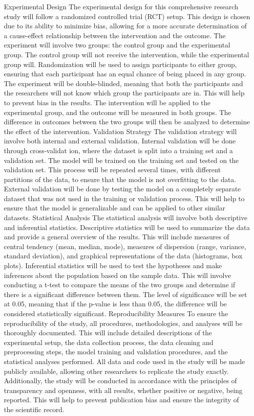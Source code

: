 \documentclass[conference]{IEEEtran}
\begin{document}
Experimental Design The experimental design for this comprehensive research study will follow a randomized controlled trial (RCT) setup. This design is chosen due to its ability to minimize bias, allowing for a more accurate determination of a cause-effect relationship between the intervention and the outcome. The experiment will involve two groups: the control group and the experimental group. The control group will not receive the intervention, while the experimental group will. Randomization will be used to assign participants to either group, ensuring that each participant has an equal chance of being placed in any group. The experiment will be double-blinded, meaning that both the participants and the researchers will not know which group the participants are in. This will help to prevent bias in the results. The intervention will be applied to the experimental group, and the outcome will be measured in both groups. The difference in outcomes between the two groups will then be analyzed to determine the effect of the intervention. Validation Strategy The validation strategy will involve both internal and external validation. Internal validation will be done through cross-validat ion, where the dataset is split into a training set and a validation set. The model will be trained on the training set and tested on the validation set. This process will be repeated several times, with different partitions of the data, to ensure that the model is not overfitting to the data. External validation will be done by testing the model on a completely separate dataset that was not used in the training or validation process. This will help to ensure that the model is generalizable and can be applied to other similar datasets. Statistical Analysis The statistical analysis will involve both descriptive and inferential statistics. Descriptive statistics will be used to summarize the data and provide a general overview of the results. This will include measures of central tendency (mean, median, mode), measures of dispersion (range, variance, standard deviation), and graphical representations of the data (histograms, box plots). Inferential statistics will be used to test the hypotheses and make inferences about the population based on the sample data. This will involve conducting a t-test to compare the means of the two groups and determine if there is a significant difference between them. The level of significance will be set at 0.05, meaning that if the p-value is less than 0.05, the difference will be considered statistically significant. Reproducibility Measures To ensure the reproducibility of the study, all procedures, methodologies, and analyses will be thoroughly documented. This will include detailed descriptions of the experimental setup, the data collection process, the data cleaning and preprocessing steps, the model training and validation procedures, and the statistical analyses performed. All data and code used in the study will be made publicly available, allowing other researchers to replicate the study exactly. Additionally, the study will be conducted in accordance with the principles of transparency and openness, with all results, whether positive or negative, being reported. This will help to prevent publication bias and ensure the integrity of the scientific record.
\end{document}
